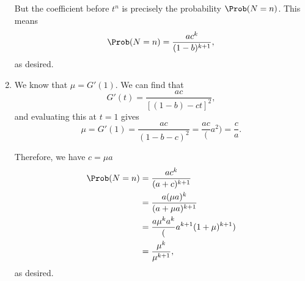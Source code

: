 \begin{enumerate}
          But the coefficient before \(t^n\) is precisely the probability \(\Prob(N = n)\). This means
          \[
              \Prob(N = n) = \frac{ac^k}{(1 - b)^{k + 1}},
          \]
          as desired.

    \item We know that \(\mu = G'(1)\). We can find that
          \[
              G'(t) = \frac{ac}{[(1 - b) - ct]^2},
          \]
          and evaluating this at \(t = 1\) gives
          \[
              \mu = G'(1) = \frac{ac}{(1 - b - c)^2} = \frac{ac}(a^2) = \frac{c}{a}.
          \]

          Therefore, we have \(c = \mu a\)
          \begin{align*}
              \Prob(N = n) & = \frac{a c^k}{(a + c)^{k + 1}}                   \\
                           & = \frac{a (\mu a)^k}{(a + \mu a)^{k + 1}}         \\
                           & = \frac{a \mu^k a^k}(a^{k + 1} (1 + \mu)^{k + 1}) \\
                           & = \frac{\mu^k}{\mu^{k + 1}},
          \end{align*}
          as desired.
\end{enumerate}